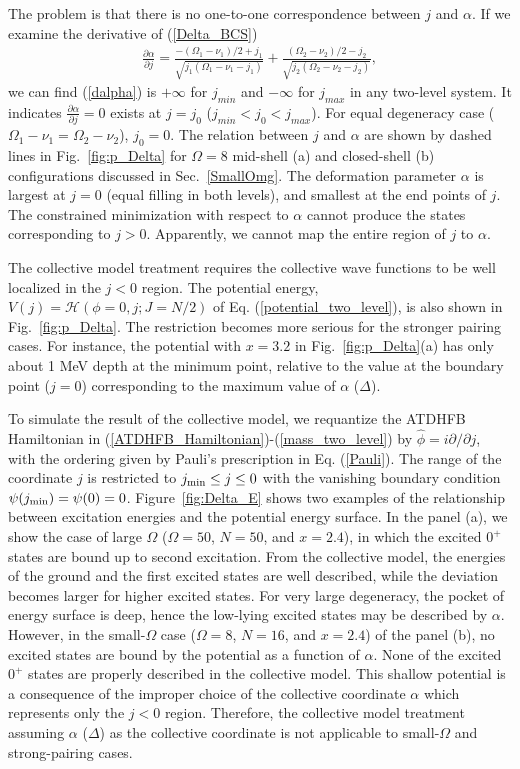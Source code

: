 \documentclass[11pt]{book} %
\begin{document}
The problem is that
there is no one-to-one correspondence between $j$ and $\alpha$.
If we examine the derivative of (\ref{Delta_BCS})
\begin{align}
\frac{\partial\alpha}{\partial j} = \frac{-(\Omega_1-\nu_1)/2+j_1}{\sqrt{j_1(\Omega_1-\nu_1-j_1)}} + \frac{(\Omega_2-\nu_2)/2-j_2}{\sqrt{j_2(\Omega_2-\nu_2-j_2)}} ,
 \label{dalpha}
\end{align}
we can find (\ref{dalpha}) is $+\infty$ for $j_{min}$ and $-\infty$ for $j_{max}$ in any two-level system. It indicates $\frac{\partial\alpha}{\partial j} =0$ exists at $j=j_0$ ($j_{min}<j_0<j_{max}$). For equal degeneracy case ($\Omega_1-\nu_1=\Omega_2-\nu_2$), $j_0=0$. 
The relation between $j$ and $\alpha$ 
are shown by dashed lines in Fig.~\ref{fig:p_Delta} 
for $\Omega=8$ mid-shell (a) and closed-shell (b) configurations discussed in Sec.~\ref{SmallOmg}.
The deformation parameter $\alpha$ is largest at $j=0$ (equal filling in both levels),
and smallest at the end points of $j$.
The constrained minimization with respect to $\alpha$ cannot 
produce the states corresponding to $j>0$.
Apparently, we cannot map the entire region of $j$ to $\alpha$.

The collective model treatment
requires the collective wave functions to be well localized
in the $j<0$ region.
The potential energy, $V(j)=\mathcal{H}(\phi=0,j;J=N/2)$ of
Eq. (\ref{potential_two_level}), is also shown in
Fig.~\ref{fig:p_Delta}.
The restriction becomes more serious for the stronger pairing cases.
For instance, the potential with $x=3.2$ in Fig.~\ref{fig:p_Delta}(a)
has only about 1 MeV depth at the minimum point, relative to the value
at the boundary point ($j=0$) corresponding to
the maximum value of $\alpha$ ($\Delta$).

To simulate the result of the collective model, we requantize the ATDHFB Hamiltonian in (\ref{ATDHFB_Hamiltonian})-(\ref{mass_two_level}) by $\hat{\phi}=i\partial/\partial j$, with
the ordering given by Pauli's prescription in Eq. (\ref{Pauli}).
The range of the coordinate $j$ is restricted to $j_{\rm min}\leq j \leq 0$
with the vanishing boundary condition $\psi(j_{\rm min})=\psi(0)=0$.
Figure~\ref{fig:Delta_E} shows two examples of the relationship 
between excitation energies and the potential energy surface.
In the panel (a), we show the case of large $\Omega$
($\Omega=50$, $N=50$, and $x=2.4$),
in which
the excited $0^+$ states are bound up to second excitation.
From the collective model, the energies of the ground and the first excited states
are well described, while the deviation becomes larger for
higher excited states.
For very large degeneracy, the pocket of energy surface is deep, 
hence the low-lying excited states may be described by $\alpha$. 
However, in the small-$\Omega$ case ($\Omega=8$, $N=16$, and $x=2.4$)
of the panel (b), no excited states are bound by the potential
as a function of $\alpha$.
None of the excited $0^+$ states
are properly described in the collective model.
This shallow potential is a consequence of the improper
choice of the collective coordinate $\alpha$
which represents only the $j<0$ region.
Therefore, the collective model treatment assuming
$\alpha$ ($\Delta$) as the collective coordinate
is not applicable to small-$\Omega$ and strong-pairing cases.
\end{document}
